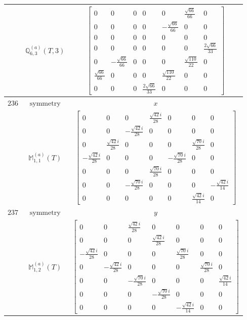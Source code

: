 \documentclass[fleqn,8pt,landscape]{jsarticle}
\begin{document}
\begin{longtable}{ccc}
$  $ & $ \mathbb{Q}_{6,3}^{(a)}(T,3) $ & $ \begin{bmatrix} 0 & 0 & 0 & 0 & 0 & \frac{\sqrt{66}}{66} & 0 \\ 0 & 0 & 0 & 0 & - \frac{\sqrt{66}}{66} & 0 & 0 \\ 0 & 0 & 0 & 0 & 0 & 0 & 0 \\ 0 & 0 & 0 & 0 & 0 & 0 & \frac{2 \sqrt{66}}{33} \\ 0 & - \frac{\sqrt{66}}{66} & 0 & 0 & 0 & \frac{\sqrt{110}}{22} & 0 \\ \frac{\sqrt{66}}{66} & 0 & 0 & 0 & \frac{\sqrt{110}}{22} & 0 & 0 \\ 0 & 0 & 0 & \frac{2 \sqrt{66}}{33} & 0 & 0 & 0 \end{bmatrix} $ \\ \hline
$ 236 $ & $ \text{symmetry} $ & $ x $ \\
$  $ & $ \mathbb{M}_{1,1}^{(a)}(T) $ & $ \begin{bmatrix} 0 & 0 & 0 & \frac{\sqrt{42} i}{28} & 0 & 0 & 0 \\ 0 & 0 & - \frac{\sqrt{42} i}{28} & 0 & 0 & 0 & 0 \\ 0 & \frac{\sqrt{42} i}{28} & 0 & 0 & 0 & \frac{\sqrt{70} i}{28} & 0 \\ - \frac{\sqrt{42} i}{28} & 0 & 0 & 0 & - \frac{\sqrt{70} i}{28} & 0 & 0 \\ 0 & 0 & 0 & \frac{\sqrt{70} i}{28} & 0 & 0 & 0 \\ 0 & 0 & - \frac{\sqrt{70} i}{28} & 0 & 0 & 0 & - \frac{\sqrt{42} i}{14} \\ 0 & 0 & 0 & 0 & 0 & \frac{\sqrt{42} i}{14} & 0 \end{bmatrix} $ \\ \hline
$ 237 $ & $ \text{symmetry} $ & $ y $ \\
$  $ & $ \mathbb{M}_{1,2}^{(a)}(T) $ & $ \begin{bmatrix} 0 & 0 & \frac{\sqrt{42} i}{28} & 0 & 0 & 0 & 0 \\ 0 & 0 & 0 & \frac{\sqrt{42} i}{28} & 0 & 0 & 0 \\ - \frac{\sqrt{42} i}{28} & 0 & 0 & 0 & \frac{\sqrt{70} i}{28} & 0 & 0 \\ 0 & - \frac{\sqrt{42} i}{28} & 0 & 0 & 0 & \frac{\sqrt{70} i}{28} & 0 \\ 0 & 0 & - \frac{\sqrt{70} i}{28} & 0 & 0 & 0 & \frac{\sqrt{42} i}{14} \\ 0 & 0 & 0 & - \frac{\sqrt{70} i}{28} & 0 & 0 & 0 \\ 0 & 0 & 0 & 0 & - \frac{\sqrt{42} i}{14} & 0 & 0 \end{bmatrix} $ \\ \hline

\end{longtable}
\end{document}

